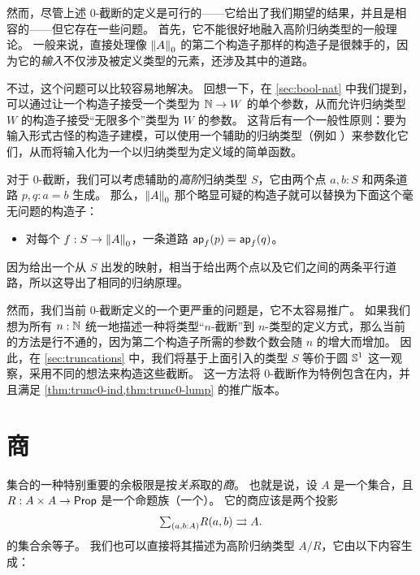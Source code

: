 然而，尽管上述 $0$-截断的定义是可行的——它给出了我们期望的结果，并且是相容的——但它存在一些问题。
首先，它不能很好地融入高阶归纳类型的一般理论。
一般来说，直接处理像 $\trunc0A$ 的第二个构造子那样的构造子是很棘手的，因为它的\emph{输入}不仅涉及被定义类型的元素，还涉及其中的道路。

不过，这个问题可以比较容易地解决。
回想一下，在 \cref{sec:bool-nat} 中我们提到，可以通过让一个构造子接受一个类型为 $\nat\to W$ 的单个参数，从而允许归纳类型 $W$ 的构造子接受“无限多个”类型为 $W$ 的参数。
这背后有一个一般性原则：要为输入形式古怪的构造子建模，可以使用一个辅助的归纳类型（例如 \nat）来参数化它们，从而将输入化为一个以归纳类型为定义域的简单函数。

对于 $0$-截断，我们可以考虑辅助的\emph{高阶}归纳类型 $S$，它由两个点 $a,b:S$ 和两条道路 $p,q:a=b$ 生成。
那么，$\trunc 0A$ 那个略显可疑的构造子就可以替换为下面这个毫无问题的构造子：


\begin{itemize}
\item 对每个 $f:S\to \trunc 0A$，一条道路 $\apfunc{f}(p) = \apfunc{f}(q)$。
\end{itemize}


因为给出一个从 $S$ 出发的映射，相当于给出两个点以及它们之间的两条平行道路，所以这导出了相同的归纳原理。

%

%
%
然而，我们当前 $0$-截断定义的一个更严重的问题是，它不太容易推广。
如果我们想为所有 $n:\nat$ 统一地描述一种将类型“$n$-截断”到 $n$-类型的定义方式，那么当前的方法是行不通的，因为第二个构造子所需的参数个数会随 $n$ 的增大而增加。
因此，在 \cref{sec:truncations} 中，我们将基于上面引入的类型 $S$ 等价于圆 $\Sn^1$ 这一观察，采用不同的想法来构造这些截断。
这一方法将 $0$-截断作为特例包含在内，并且满足 \cref{thm:trunc0-ind,thm:trunc0-lump} 的推广版本。

\section{商}
\label{sec:set-quotients}

集合的一种特别重要的余极限是按\emph{关系}取的\emph{商}。
也就是说，设 $A$ 是一个集合，且 $R:A\times A \to \prop$ 是一个命题族（一个）。
%
%
它的商应该是两个投影
\[ \tsm{a,b:A} R(a,b) \rightrightarrows A. \]
的集合余等子。
我们也可以直接将其描述为高阶归纳类型 $A/R$，它由以下内容生成：
%
%
%


